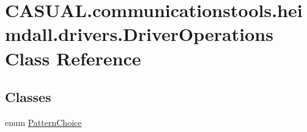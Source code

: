 \hypertarget{class_c_a_s_u_a_l_1_1communicationstools_1_1heimdall_1_1drivers_1_1_driver_operations}{\section{C\-A\-S\-U\-A\-L.\-communicationstools.\-heimdall.\-drivers.\-Driver\-Operations Class Reference}
\label{class_c_a_s_u_a_l_1_1communicationstools_1_1heimdall_1_1drivers_1_1_driver_operations}
}
\subsection*{Classes}
\begin{DoxyCompactItemize}
\item 
enum \hyperlink{enum_c_a_s_u_a_l_1_1communicationstools_1_1heimdall_1_1drivers_1_1_driver_operations_1_1_pattern_choice}{Pattern\-Choice}
\end{DoxyCompactItemize}
